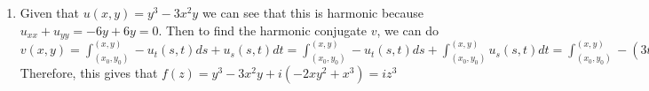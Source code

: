 \documentclass{article}
\theoremstyle{definition}
\begin{document}
\begin{enumerate}
\begin{enumerate}
        Given that $u(x, y) = xy$, this is harmonic because $u_{xx} + u_{yy} = 0 + 0 = 0$. Therefore, to find the harmonic conjugate of $u$ we have that $v(x, y) = \int_{(x_0, y_0)}^{(x, y)}-u_t(s, t)ds + u_s(s, t)dt = \int_{(x_0, y_0)}^{(x, y)}-u_t(s, t)ds + \int_{(x_0, y_0)}^{(x, y)} u_s(s, t)dt = \int_{(x_0, y_0)}^{(x, y)}-sds + \int_{(x_0, y_0)}^{(x, y)}tdt = \frac{1}{2}(-x^2) + \frac{1}{2}y^2 = -\frac{1}{2}(x^2 + y^2)$ which means that the harmonic conjugate $v(x, y) = -\frac{1}{2}(x^2 - y^2).$ This therefore means that $f(z) = xy + i(-\frac{1}{2}(x^2 - y^2)) = -\frac{i}{2}z^2.$

        \item

        Given that $u(x, y) = y^3 - 3x^2y$ we can see that this is harmonic because $u_{xx} + u_{yy} = -6y + 6y = 0$. Then to find the harmonic conjugate $v$, we can do $v(x, y) = \int_{(x_0, y_0)}^{(x, y)}-u_t(s, t)ds + u_s(s, t)dt = \int_{(x_0, y_0)}^{(x, y)}-u_t(s, t)ds + \int_{(x_0, y_0)}^{(x, y)} u_s(s, t)dt = \int_{(x_0, y_0)}^{(x, y)}-(3t^2 - 3s^2)ds + \int_{(x_0, y_0)}^{(x, y)}(-6st)dt = -3xy^2 + x^3.$ Therefore, this gives that $f(z) = y^3 - 3x^2y + i(-2xy^2 + x^3) = iz^3$
        
    \end{enumerate}
    
\end{enumerate}
\end{document}
